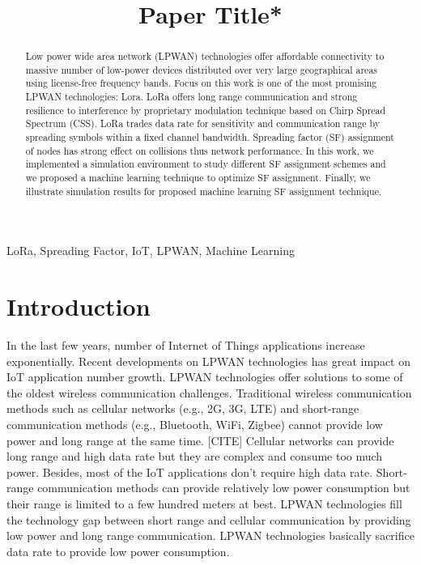 \documentclass[conference]{IEEEtran}
\begin{document}
\title{Paper Title*
}


\author{
}
\maketitle


\begin{abstract}
Low power wide area network (LPWAN) technologies offer affordable connectivity to massive number of low-power devices distributed over very large geographical areas using license-free frequency bands. Focus on this work is one of the most promising LPWAN technologies: Lora. LoRa offers long range communication and strong resilience to interference by proprietary modulation technique based on Chirp Spread Spectrum (CSS). LoRa trades data rate for sensitivity and communication range by spreading symbols within a fixed channel bandwidth. Spreading factor (SF) assignment of nodes has strong effect on collisions thus network performance. In this work, we implemented a simulation environment to study different SF assignment schemes and we proposed a machine learning technique to optimize SF assignment. Finally, we illustrate simulation results for proposed machine learning SF assignment technique.
\end{abstract}


\begin{IEEEkeywords}
LoRa, Spreading Factor, IoT, LPWAN, Machine Learning
\end{IEEEkeywords}


\section{Introduction}
\par In the last few years, number of Internet of Things applications increase exponentially. \cite{7721743} Recent developments on LPWAN technologies has great impact on IoT application number growth. LPWAN technologies offer solutions to some of the oldest wireless communication challenges. Traditional wireless communication methods such as cellular networks (e.g., 2G, 3G, LTE) and short-range communication methods (e.g., Bluetooth, WiFi, Zigbee) cannot provide low power and long range at the same time. [CITE] Cellular networks can provide long range and high data rate but they are complex and consume too much power. Besides, most of the IoT applications don't require high data rate. Short-range communication methods can provide relatively low power consumption but their range is limited to a few hundred meters at best. \cite{7815384} LPWAN technologies fill the technology gap between short range and cellular communication by providing low power and long range communication. LPWAN technologies basically sacrifice data rate to provide low power consumption.
\end{document}
